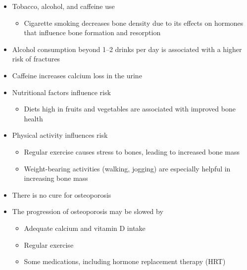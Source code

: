 \documentclass[title={Chapter 9}]{fdsn201notes}
\begin{document}
\begin{itemize}
	\item Tobacco, alcohol, and caffeine use
	\begin{itemize}
		\item Cigarette smoking decreases bone density due to its effects on hormones that influence bone formation and resorption
	\end{itemize}
	\item Alcohol consumption beyond 1--2 drinks per day is associated with a higher risk of fractures
	\item Caffeine increases calcium loss in the urine
	\item Nutritional factors influence risk
	\begin{itemize}
		\item Diets high in fruits and vegetables are associated with improved bone health
	\end{itemize}
	\item Physical activity influences risk
	\begin{itemize}
		\item Regular exercise causes stress to bones, leading to increased bone mass
		\item Weight-bearing activities (walking, jogging) are especially helpful in increasing bone mass
	\end{itemize}
	\item There is no cure for osteoporosis
	\item The progression of osteoporosis may be slowed by
	\begin{itemize}
		\item Adequate calcium and vitamin D intake
		\item Regular exercise
		\item Some medications, including hormone replacement therapy (HRT)
	\end{itemize}
\end{itemize}
\end{document}

